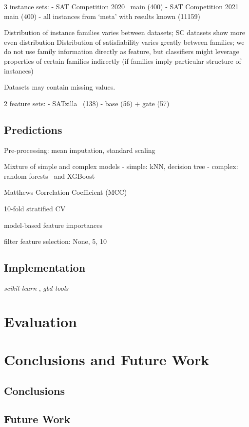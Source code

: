 \documentclass{article}
\begin{document}
3 instance sets:
- SAT Competition 2020~\cite{balyo2020proceedings} main (400)
- SAT Competition 2021~\cite{balyo2021proceedings} main (400)
- all instances from `meta' with results known (11159)

Distribution of instance families varies between datasets; SC datasets show more even distribution
Distribution of satisfiability varies greatly between families; we do not use family information directly as feature, but classifiers might leverage properties of certain families indirectly (if families imply particular structure of instances)

Datasets may contain missing values.

2 feature sets:
- SATzilla~\cite{xu2012features} (138)
- base (56) + gate (57)

\subsection{Predictions}

Pre-processing: mean imputation, standard scaling

Mixture of simple and complex models
- simple: kNN, decision tree
- complex: random forests~\cite{breiman2001random} and XGBoost~\cite{chen2016xgboost}

Matthews Correlation Coefficient (MCC)~\cite{matthews1975comparison, gorodkin2004comparing}

10-fold stratified CV

model-based feature importances

filter feature selection: None, 5, 10

\subsection{Implementation}

\emph{scikit-learn} \cite{pedregosa2011scikit}, \emph{gbd-tools}~\cite{iser2020collaborative}

\section{Evaluation}
\label{sec:evaluation}

\section{Conclusions and Future Work}
\label{sec:conclusion}

\subsection{Conclusions}

\subsection{Future Work}

\printbibliography
\end{document}
